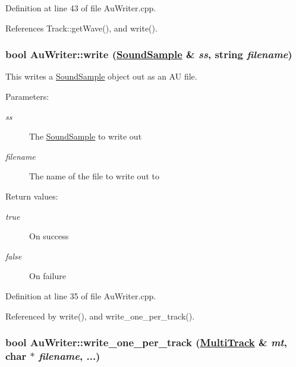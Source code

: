 Definition at line 43 of file Au\-Writer.cpp.

References Track::get\-Wave(), and write().\hypertarget{classAuWriter_e0}{
\subsubsection[write]{\setlength{\rightskip}{0pt plus 5cm}bool Au\-Writer::write (\hyperlink{classSoundSample}{Sound\-Sample} \& {\em ss}, string {\em filename})}}
\label{classAuWriter_e0}


This writes a \hyperlink{classSoundSample}{Sound\-Sample} object out as an AU file. \begin{Desc}
\item[Parameters:]
\begin{description}
\item[{\em ss}]The \hyperlink{classSoundSample}{Sound\-Sample} to write out \item[{\em filename}]The name of the file to write out to \end{description}
\end{Desc}
\begin{Desc}
\item[Return values:]
\begin{description}
\item[{\em true}]On success \item[{\em false}]On failure \end{description}
\end{Desc}


Definition at line 35 of file Au\-Writer.cpp.

Referenced by write(), and write\_\-one\_\-per\_\-track().\hypertarget{classAuWriter_e3}{
\subsubsection[write\_\-one\_\-per\_\-track]{\setlength{\rightskip}{0pt plus 5cm}bool Au\-Writer::write\_\-one\_\-per\_\-track (\hyperlink{classMultiTrack}{Multi\-Track} \& {\em mt}, char $\ast$ {\em filename}, ...)}}
\label{classAuWriter_e3}


